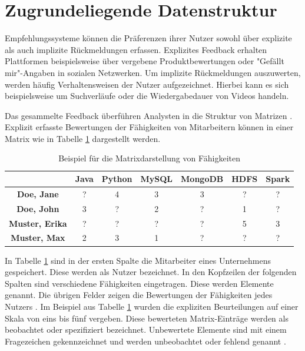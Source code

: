 \section{Zugrundeliegende Datenstruktur}
\label{ch:empfehlungssysteme:arbeitsweise}
Empfehlungssysteme können die Präferenzen ihrer Nutzer sowohl über explizite als auch implizite Rückmeldungen erfassen. Explizites Feedback erhalten Plattformen beispielsweise über vergebene Produktbewertungen oder "Gefällt mir"-Angaben in sozialen Netzwerken. Um implizite Rückmeldungen auszuwerten, werden häufig Verhaltensweisen der Nutzer aufgezeichnet. Hierbei kann es sich beispielsweise um Suchverläufe oder die Wiedergabedauer von Videos handeln. \cite[S. 3]{pu:2012}

Das gesammelte Feedback überführen Analysten in die Struktur von Matrizen \cite[S. 11f.]{recommenderSystems:2016}. Explizit erfasste Bewertungen der Fähigkeiten von Mitarbeitern können in einer Matrix wie in Tabelle \ref{tbl:empfehlungssysteme:arbeitsweise:tbl1} dargestellt werden.

\begin{table}[h]
	\centering
	\begin{tabular}{c|c|c|c|c|c|c}
	 & \textbf{Java} & \textbf{Python} & \textbf{MySQL} & \textbf{MongoDB} & \textbf{HDFS} & \textbf{Spark}\\ 
	\hline
	\textbf{Doe, Jane}     & ? & 4 & 3 & 3 & ? & ?\\
	\textbf{Doe, John}     & 3 & ? & 2 & ? & 1 & ?\\
	\textbf{Muster, Erika} & ? & ? & ? & ? & 5 & 3\\
	\textbf{Muster, Max}   & 2 & 3 & 1 & ? & ? & ?
	\end{tabular}
	\caption{Beispiel für die Matrixdarstellung von Fähigkeiten}
	\label{tbl:empfehlungssysteme:arbeitsweise:tbl1}
\end{table}

In Tabelle \ref{tbl:empfehlungssysteme:arbeitsweise:tbl1} sind in der ersten Spalte die Mitarbeiter eines Unternehmens gespeichert. Diese werden als Nutzer bezeichnet. In den Kopfzeilen der folgenden Spalten sind verschiedene Fähigkeiten eingetragen. Diese werden Elemente genannt. Die übrigen Felder zeigen die Bewertungen der Fähigkeiten jedes Nutzers \cite[S. 11f.]{recommenderSystems:2016}\cite[S. 1f.]{strub:2016}. Im Beispiel aus Tabelle \ref{tbl:empfehlungssysteme:arbeitsweise:tbl1} wurden die expliziten Beurteilungen auf einer Skala von eins bis fünf vergeben. Diese bewerteten Matrix-Einträge werden  als beobachtet oder spezifiziert bezeichnet. Unbewertete Elemente sind mit einem Fragezeichen gekennzeichnet und werden unbeobachtet oder fehlend genannt \cite[S. 8]{recommenderSystems:2016}.


